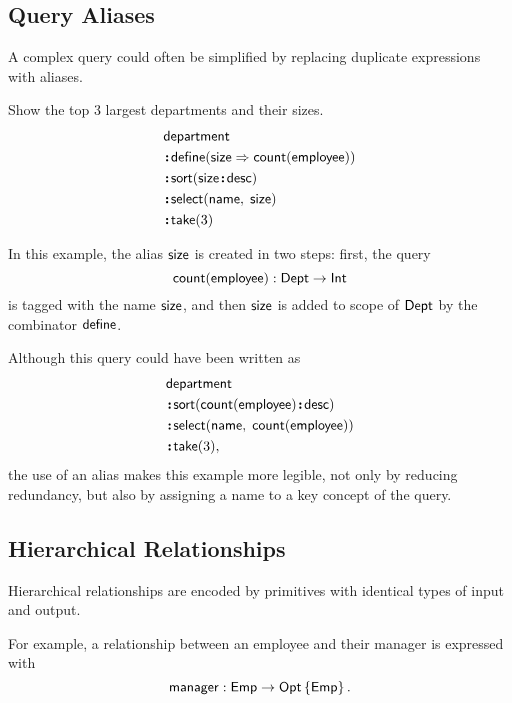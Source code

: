\subsection*{Query Aliases}

A complex query could often be simplified by replacing duplicate expressions
with aliases.

\begin{example}
    \label{ex:department-define-size}
    Show the top 3 largest departments and their sizes.
    \begin{align*}
        & \Department \\
        & \Apply\Define(\Size\As\Count(\Employee)) \\
        & \Apply\Sort(\Size\Apply\Desc) \\
        & \Apply\Select(\Name,\; \Size) \\
        & \Apply\Take(3)
    \end{align*}
\end{example}

In this example, the alias $\textup{\textsf{size}}$ is created in two steps: first, the query
\begin{equation*}
    \textup{\textsf{count}}(\textup{\textsf{employee}}): \textup{\textsf{Dept}} \to \textup{\textsf{Int}}
\end{equation*}
is tagged with the name $\textup{\textsf{size}}$, and then $\textup{\textsf{size}}$ is added to scope of $\textup{\textsf{Dept}}$
by the combinator $\textup{\textsf{define}}$.

Although this query could have been written as
\begin{align*}
    & \Department \\
    & \Apply\Sort(\Count(\Employee)\Apply\Desc) \\
    & \Apply\Select(\Name,\; \Count(\Employee)) \\
    & \Apply\Take(3),
\end{align*}
the use of an alias makes this example more legible, not only by reducing
redundancy, but also by assigning a name to a key concept of the query.

\subsection*{Hierarchical Relationships}

Hierarchical relationships are encoded by primitives with identical types of
input and output.

For example, a relationship between an employee and their manager is expressed
with
\begin{equation*}
    \textup{\textsf{manager}} : \textup{\textsf{Emp}} \to \textup{\textsf{Opt}}\left\{\textup{\textsf{Emp}}\right\}.
\end{equation*}

